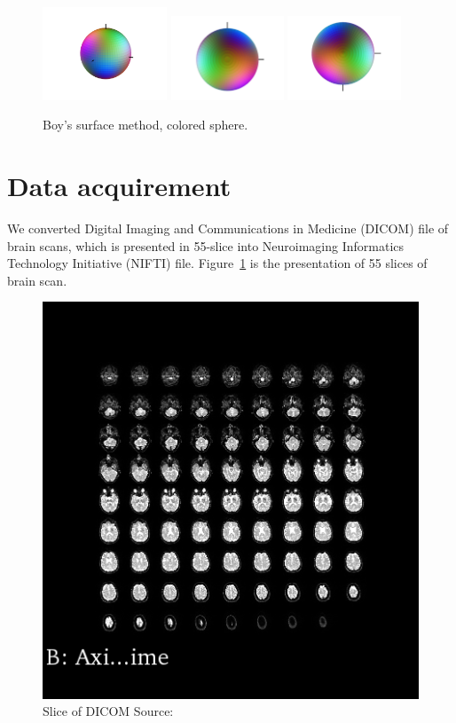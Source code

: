 \documentclass[hyperref, plainreport, noproblem]{cgvpub1}
\begin{document}
	\begin{figure}
		\centering
		\includegraphics[width=0.33\textwidth]{boys}
		\includegraphics[width=0.3\textwidth]{boys_zIn_yRight}
		\includegraphics[width=0.3\textwidth]{boys_zOut_yRight}
		\caption{Boy's surface method, colored sphere.}
	\end{figure}

\section{Data acquirement}
We converted Digital Imaging and Communications in Medicine (DICOM) file of brain scans, which is presented in 55-slice into Neuroimaging Informatics Technology Initiative (NIFTI) file. Figure~\ref{fig:2} is the presentation of 55 slices of brain scan.

\begin{figure}[ht]
    \centering
    \includegraphics[width = 0.6\columnwidth]{2}
    \caption{ Slice of DICOM  Source:  \cite{???}}
    \label{fig:2}
\end{figure}	
\end{document}
